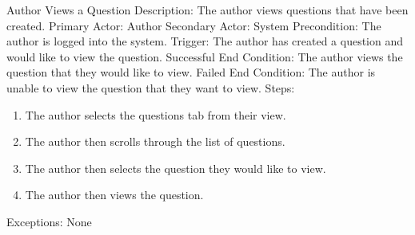     
    \begin{section}{Author Views a Question}
        Description: The author views questions that have been created. \newline
        Primary Actor: Author \newline
        Secondary Actor: System \newline
        Precondition: The author is logged into the system. \newline
        Trigger: The author has created a question and would like to view the question. \newline
        Successful End Condition: The author views the question that they would like to view. \newline
        Failed End Condition: The author is unable to view the question that they want to view. \newline
        \newline
        Steps:
        \begin{enumerate}
            \item{The author selects the questions tab from their view.}
            \item{The author then scrolls through the list of questions.}
            \item{The author then selects the question they would like to view.}
            \item{The author then views the question.}
        \end{enumerate}
        Exceptions: None
    \end{section}
    
